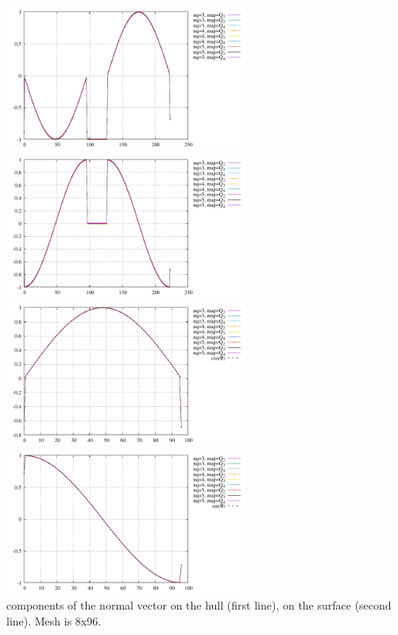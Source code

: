 \begin{center}
\includegraphics[width=8cm]{python_codes/fieldstone_152/RESULTS/normals/nx}
\includegraphics[width=8cm]{python_codes/fieldstone_152/RESULTS/normals/ny}\\
\includegraphics[width=8cm]{python_codes/fieldstone_152/RESULTS/normals/nnx}
\includegraphics[width=8cm]{python_codes/fieldstone_152/RESULTS/normals/nny}\\
{\captionfont components of the normal vector on the hull (first line),
on the surface (second line). Mesh is 8x96.}
\end{center}

